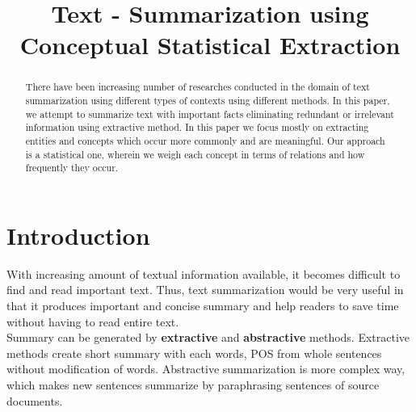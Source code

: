 \documentclass[conference]{IEEEtran}
\begin{document}
\title{Text - Summarization using Conceptual Statistical Extraction}


\author{
\and
{}
}
\graphicspath{ {/home/flipswitch/junkyard/text-summarizer/documentation/} }
\maketitle
\begin{abstract}
There have been increasing number of researches conducted in the domain of text summarization using different types of contexts using different methods. In this paper, we attempt to summarize text with important facts eliminating redundant or irrelevant information using extractive method. In this paper we focus mostly on extracting entities and concepts which occur more commonly and are meaningful. Our approach is a statistical one, wherein we weigh each concept in terms of relations and how frequently they occur.
\end{abstract}
\IEEEpeerreviewmaketitle



\section{Introduction}
With increasing amount of textual information available, it becomes difficult to find and read important text. Thus, text summarization would be very useful in that it produces important and concise summary and help readers to save time without having to read entire text.\\

Summary can be generated by \textbf{extractive} and \textbf{abstractive} methods. Extractive methods create short summary with each words, POS from whole sentences without modification of words. Abstractive summarization is more complex way, which makes new sentences summarize by paraphrasing sentences of source documents.
\end{document}
